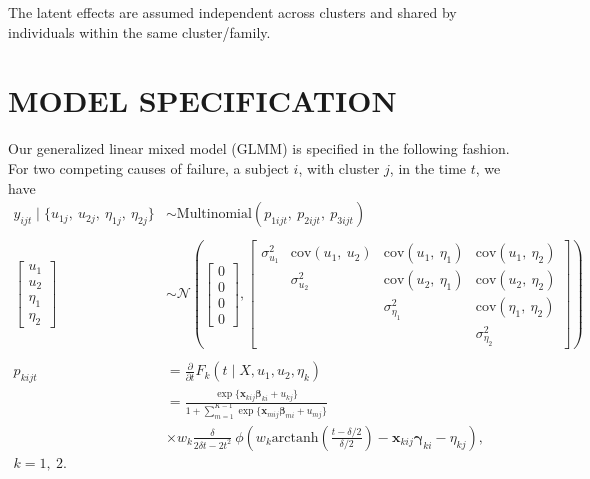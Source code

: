The latent effects are assumed independent across clusters and shared by
individuals within the same cluster/family.

\section{MODEL SPECIFICATION}
\label{cap:modelitself}

Our generalized linear mixed model (GLMM) is specified in the following
fashion. For two competing causes of failure, a subject \(i\), with
cluster \(j\), in the time \(t\), we have
\begin{align}
  y_{i j t} \mid \{u_{1j},~u_{2j},~\eta_{1j},~\eta_{2j}\}&\sim
  \text{Multinomial}(p_{1ijt},~p_{2ijt},~p_{3ijt})\nonumber\\
  \nonumber\\
  \begin{bmatrix} u_{1}\\u_{2}\\\eta_{1}\\\eta_{2} \end{bmatrix}&\sim
  \mathcal{N} \left(\begin{bmatrix} 0\\0\\0\\0\end{bmatrix},
  \begin{bmatrix}
    \sigma_{u_{1}}^{2}&
    \text{cov}(u_{1},~u_{2})&
    \text{cov}(u_{1},~\eta_{1})&\text{cov}(u_{1},~\eta_{2})\\
    &\sigma_{u_{2}}^{2}&
    \text{cov}(u_{2},~\eta_{1})&\text{cov}(u_{2},~\eta_{2})\\
    &&\sigma_{\eta_{1}}^{2}&\text{cov}(\eta_{1},~\eta_{2})\\
    &&&\sigma_{\eta_{2}}^{2}
  \end{bmatrix}\right)\nonumber\\
  \nonumber\\
  p_{kijt} &=
  \frac{\partial}{\partial t}F_{k} (t \mid X, u_{1}, u_{2}, \eta_{k})
  \nonumber\\
  &= \frac{\exp\{\bm{x}_{kij}\bm{\beta}_{ki} + u_{kj}\}}{
    1 + \sum_{m=1}^{K-1}\exp\{\bm{x}_{mij}\bm{\beta}_{mi} + u_{mj}\}}
  \label{eq:model}\\
  &\times w_{k}\frac{\delta}{2\delta t - 2t^{2}}~
  \phi\left(
    w_{k}
    \text{arctanh}\left(\frac{t-\delta/2}{\delta/2}\right)
    - \bm{x}_{kij}\bm{\gamma}_{ki} - \eta_{kj}
    \right),\nonumber\\ k = 1,~2.\nonumber
\end{align}


